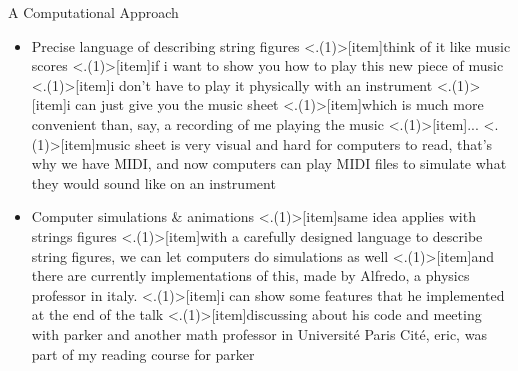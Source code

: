 \begin{frame}{A Computational Approach}
\begin{itemize}[<+(1)->]
    \item Precise language of describing string figures
    \note<.(1)>[item]{think of it like music scores}
    \note<.(1)>[item]{if i want to show you how to play this new piece of music}
    \note<.(1)>[item]{i don't have to play it physically with an instrument}
    \note<.(1)>[item]{i can just give you the music sheet}
    \note<.(1)>[item]{which is much more convenient than, say, a recording of me playing the music}
    \note<.(1)>[item]{...}
    \note<.(1)>[item]{music sheet is very visual and hard for computers to read, that's why we have MIDI, and now computers can play MIDI files to simulate what they would sound like on an instrument}
    \item Computer simulations \& animations
    \note<.(1)>[item]{same idea applies with strings figures}
    \note<.(1)>[item]{with a carefully designed language to describe string figures, we can let computers do simulations as well}
    \note<.(1)>[item]{and there are currently implementations of this, made by Alfredo, a physics professor in italy.}
    \note<.(1)>[item]{i can show some features that he implemented at the end of the talk}
    \note<.(1)>[item]{discussing about his code and meeting with parker and another math professor in Université Paris Cité, eric, was part of my reading course for parker}
\end{itemize}

\end{frame}
